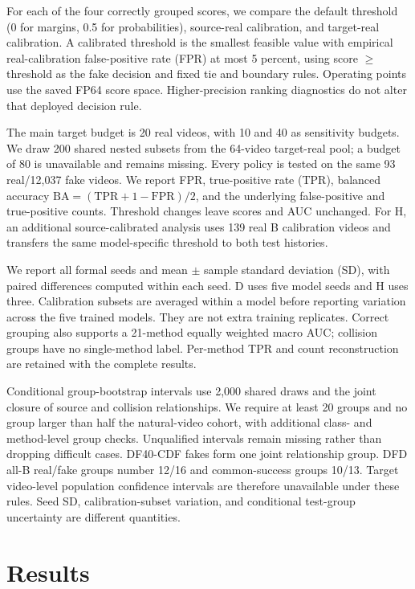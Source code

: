 \documentclass{ieeeaccess}
\begin{document}
For each of the four correctly grouped scores, we compare the default
threshold (0 for margins, 0.5 for probabilities), source-real
calibration, and target-real calibration. A calibrated threshold is the
smallest feasible value with empirical real-calibration false-positive
rate (FPR) at most 5 percent, using score \(\geq\) threshold as the fake
decision and fixed tie and boundary rules. Operating points use the
saved FP64 score space. Higher-precision ranking diagnostics do not
alter that deployed decision rule.

The main target budget is 20 real videos, with 10 and 40 as sensitivity
budgets. We draw 200 shared nested subsets from the 64-video target-real
pool; a budget of 80 is unavailable and remains missing. Every policy is
tested on the same 93 real/12,037 fake videos. We report FPR,
true-positive rate (TPR), balanced accuracy
\(\mathrm{BA}=(\mathrm{TPR}+1-\mathrm{FPR})/2\), and the underlying
false-positive and true-positive counts. Threshold changes leave scores
and AUC unchanged. For H, an additional source-calibrated analysis uses
139 real B calibration videos and transfers the same model-specific
threshold to both test histories.

We report all formal seeds and mean \(\pm\) sample standard deviation
(SD), with paired differences computed within each seed. D uses five
model seeds and H uses three. Calibration subsets are averaged within a
model before reporting variation across the five trained models. They
are not extra training replicates. Correct grouping also supports a
21-method equally weighted macro AUC; collision groups have no
single-method label. Per-method TPR and count reconstruction are
retained with the complete results.

Conditional group-bootstrap intervals use 2,000 shared draws and the
joint closure of source and collision relationships. We require at least
20 groups and no group larger than half the natural-video cohort, with
additional class- and method-level group checks. Unqualified intervals
remain missing rather than dropping difficult cases. DF40-CDF fakes form
one joint relationship group. DFD all-B real/fake groups number 12/16
and common-success groups 10/13. Target video-level population
confidence intervals are therefore unavailable under these rules. Seed
SD, calibration-subset variation, and conditional test-group uncertainty
are different quantities.

\section{Results}\label{results}
\end{document}
